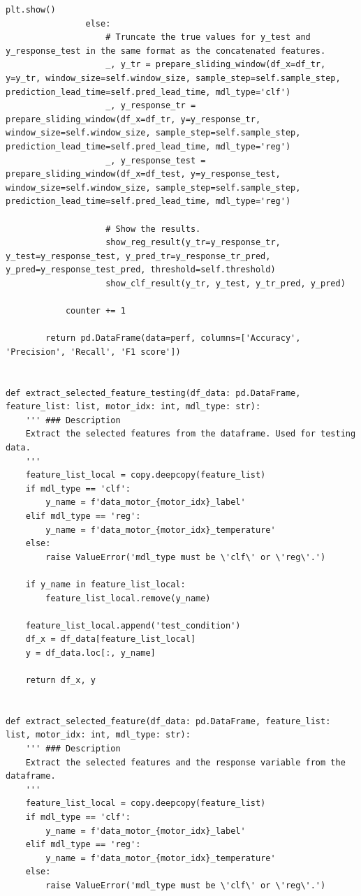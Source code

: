 \documentclass[11pt,a4paper]{article}
\begin{document}
\begin{lstlisting}[style=pyfull]
                    plt.show()
                else:
                    # Truncate the true values for y_test and y_response_test in the same format as the concatenated features.
                    _, y_tr = prepare_sliding_window(df_x=df_tr, y=y_tr, window_size=self.window_size, sample_step=self.sample_step, prediction_lead_time=self.pred_lead_time, mdl_type='clf')
                    _, y_response_tr = prepare_sliding_window(df_x=df_tr, y=y_response_tr, window_size=self.window_size, sample_step=self.sample_step, prediction_lead_time=self.pred_lead_time, mdl_type='reg')
                    _, y_response_test = prepare_sliding_window(df_x=df_test, y=y_response_test, window_size=self.window_size, sample_step=self.sample_step, prediction_lead_time=self.pred_lead_time, mdl_type='reg')

                    # Show the results.
                    show_reg_result(y_tr=y_response_tr, y_test=y_response_test, y_pred_tr=y_response_tr_pred, y_pred=y_response_test_pred, threshold=self.threshold)
                    show_clf_result(y_tr, y_test, y_tr_pred, y_pred)

            counter += 1

        return pd.DataFrame(data=perf, columns=['Accuracy', 'Precision', 'Recall', 'F1 score'])


def extract_selected_feature_testing(df_data: pd.DataFrame, feature_list: list, motor_idx: int, mdl_type: str):
    ''' ### Description
    Extract the selected features from the dataframe. Used for testing data.
    '''
    feature_list_local = copy.deepcopy(feature_list)
    if mdl_type == 'clf':
        y_name = f'data_motor_{motor_idx}_label'
    elif mdl_type == 'reg':
        y_name = f'data_motor_{motor_idx}_temperature'
    else:
        raise ValueError('mdl_type must be \'clf\' or \'reg\'.')

    if y_name in feature_list_local:
        feature_list_local.remove(y_name)

    feature_list_local.append('test_condition')
    df_x = df_data[feature_list_local]
    y = df_data.loc[:, y_name]

    return df_x, y


def extract_selected_feature(df_data: pd.DataFrame, feature_list: list, motor_idx: int, mdl_type: str):
    ''' ### Description
    Extract the selected features and the response variable from the dataframe.
    '''
    feature_list_local = copy.deepcopy(feature_list)
    if mdl_type == 'clf':
        y_name = f'data_motor_{motor_idx}_label'
    elif mdl_type == 'reg':
        y_name = f'data_motor_{motor_idx}_temperature'
    else:
        raise ValueError('mdl_type must be \'clf\' or \'reg\'.')


\end{lstlisting}
\end{document}
